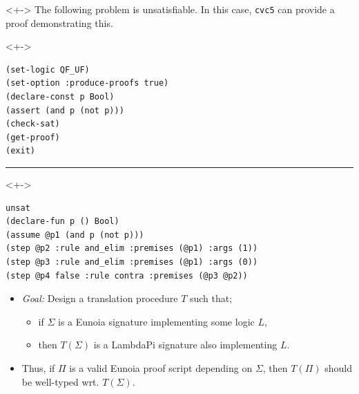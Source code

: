 \documentclass[handout, lualatex, compress, 12pt-------------------------------------------------------------------------------------------------------------]{beamer}
\begin{document}
\begin{frame}
	\begin{uncoverenv}<+->
		\exxample
		The following problem is \alert{unsatisfiable}.
		In this case, \texttt{cvc5} can provide a \alert{proof} demonstrating this.
	\end{uncoverenv}
	\begin{uncoverenv}<+->
		\begin{lstlisting}[basicstyle=\ttfamily\footnotesize]
(set-logic QF_UF)
(set-option :produce-proofs true)
(declare-const p Bool)
(assert (and p (not p)))
(check-sat)
(get-proof)
(exit)\end{lstlisting}
	\end{uncoverenv}
	\hrule
	\begin{uncoverenv}<+->
		\begin{lstlisting}[basicstyle=\ttfamily\footnotesize]
unsat
(declare-fun p () Bool)
(assume @p1 (and p (not p)))
(step @p2 :rule and_elim :premises (@p1) :args (1))
(step @p3 :rule and_elim :premises (@p1) :args (0))
(step @p4 false :rule contra :premises (@p3 @p2))\end{lstlisting}
	\end{uncoverenv}
\end{frame}


\begin{frame}{}
	\begin{itemize}
		\item<+-> \emph{\color{oc-green-9}Goal:}
		      Design a translation procedure $T$ such that;
		      \begin{itemize}
			      \item<+-> if $Σ$ is a Eunoia signature implementing some \alert{logic} $L$,
			      \item<+-> then $T(Σ)$ is a LambdaPi signature also implementing $L$.
			            \\[2mm]
		      \end{itemize}

		\item<+-> Thus, if $Π$ is a valid Eunoia \alert{proof script} depending on $Σ$,
		      then $T(Π)$ should be \alert{well-typed} wrt. $T(Σ)$.
	\end{itemize}
\end{frame}
\end{document}
